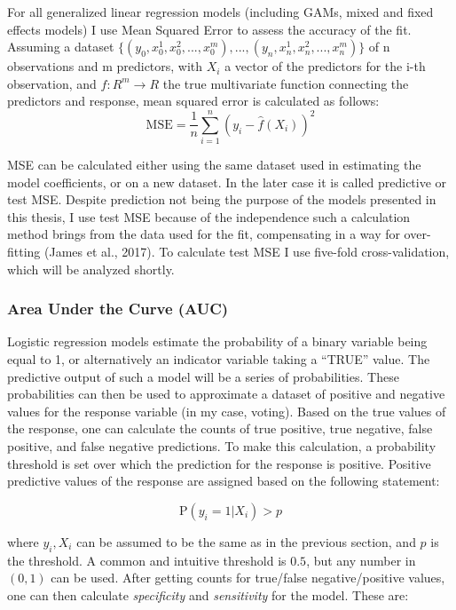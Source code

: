\documentclass[12pt,twoside]{reedthesis}
\begin{document}
  For all generalized linear regression models (including GAMs, mixed and
  fixed effects models) I use Mean Squared Error to assess the accuracy of
  the fit. Assuming a dataset
  \(\{(y_0, x_0^1, x_0^2, ..., x_0^m),...,(y_n, x_n^1, x_n^2, ..., x_n^m)\}\)
  of n observations and m predictors, with \(X_i\) a vector of the
  predictors for the i-th observation, and \(f:R^m \to R\) the true
  multivariate function connecting the predictors and response, mean
  squared error is calculated as follows:
  \[\text{MSE} = \frac{1}{n}\sum_{i=1}^{n}(y_i - \hat{f}(X_i))^2\]
  
  MSE can be calculated either using the same dataset used in estimating
  the model coefficients, or on a new dataset. In the later case it is
  called predictive or test MSE. Despite prediction not being the purpose
  of the models presented in this thesis, I use test MSE because of the
  independence such a calculation method brings from the data used for the
  fit, compensating in a way for over-fitting (James et al., 2017). To
  calculate test MSE I use five-fold cross-validation, which will be
  analyzed shortly.
  
  \subsubsection{Area Under the Curve
  (AUC)}\label{area-under-the-curve-auc}
  
  Logistic regression models estimate the probability of a binary variable
  being equal to 1, or alternatively an indicator variable taking a
  ``TRUE'' value. The predictive output of such a model will be a series
  of probabilities. These probabilities can then be used to approximate a
  dataset of positive and negative values for the response variable (in my
  case, voting). Based on the true values of the response, one can
  calculate the counts of true positive, true negative, false positive,
  and false negative predictions. To make this calculation, a probability
  threshold is set over which the prediction for the response is positive.
  Positive predictive values of the response are assigned based on the
  following statement:
  
  \[\text{P}(y_i = 1|X_i) > p\]
  
  where \(y_i, X_i\) can be assumed to be the same as in the previous
  section, and \(p\) is the threshold. A common and intuitive threshold is
  \(0.5\), but any number in \((0,1)\) can be used. After getting counts
  for true/false negative/positive values, one can then calculate
  \emph{specificity} and \emph{sensitivity} for the model. These are:
  
\end{document}

